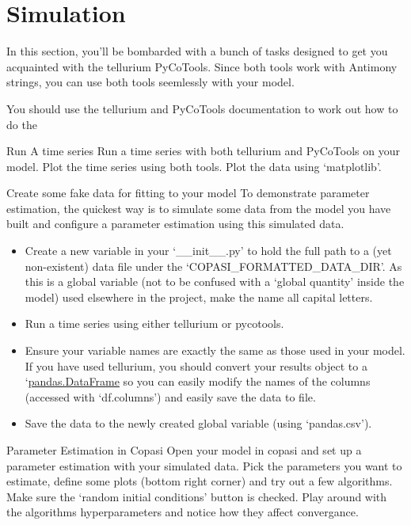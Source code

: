 \documentclass[../../main]{subfiles}
\begin{document}
\section{Simulation}
In this section, you'll be bombarded with a bunch of tasks designed to get you acquainted with the tellurium
PyCoTools. Since both tools work with Antimony strings, you can use both tools seemlessly
with your model.

You should use the tellurium and PyCoTools documentation to work out how to do the

\begin{Task}[label=TimeSeries]{Run A time series}
Run a time series with both tellurium and PyCoTools on your model. Plot the time series using both tools.
    Plot the data using `matplotlib'.
\end{Task}

\begin{Task}[label=CreateFakeData]{Create some fake data for fitting to your model}
    To demonstrate parameter estimation, the quickest way is to simulate some data from the
    model you have built and configure a parameter estimation using this simulated data.
    \begin{itemize}
        \item Create a new variable in your `\_\_init\_\_.py' to hold the full path to a
        (yet non-existent) data file under the `COPASI\_FORMATTED\_DATA\_DIR'.
        As this is a global variable (not to be confused with a `global quantity' inside the model)
        used elsewhere in the project, make the name all capital letters.
        \item Run a time series using either tellurium or pycotools.
        \item Ensure your variable names are exactly the same as those used in your model. If you have used
        tellurium, you should convert your results object to a
        `\href{https://pandas.pydata.org/pandas-docs/stable/reference/api/pandas.DataFrame.html}{pandas.DataFrame} so you can easily
        modify the names of the columns (accessed with `df.columns') and easily save the data to file.
        \item Save the data to the newly created global variable (using `pandas.csv').
    \end{itemize}
\end{Task}

\begin{Task}[label=ManualParameterEstimation]{Parameter Estimation in Copasi}
    Open your model in copasi and set up a parameter estimation with your simulated data. Pick the
    parameters you want to estimate, define some plots (bottom right corner) and try out a few algorithms.
    Make sure the `random initial conditions' button is checked. Play around with the algorithms hyperparameters and
    notice how they affect convergance.
\end{Task}
\end{document}
